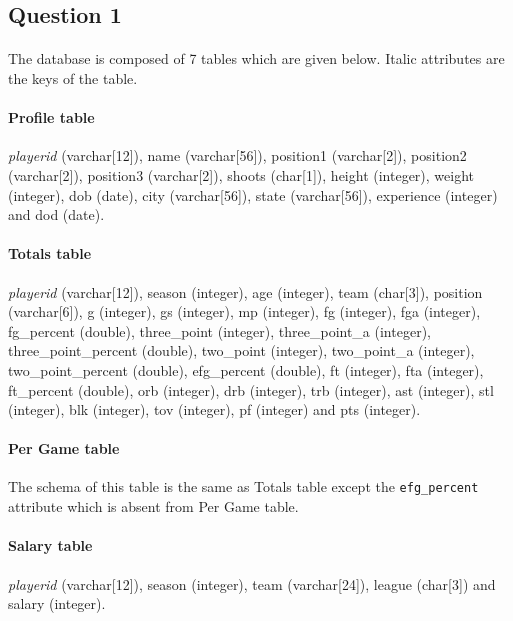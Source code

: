 
\subsection{Question 1}
\label{subsec:411}

\paragraph{}The database is composed of 7 tables which are given below. Italic attributes are the keys of the table.

\paragraph{Profile table}\textit{playerid} (varchar[12]), name (varchar[56]), position1 (varchar[2]), position2 (varchar[2]), position3 (varchar[2]), shoots (char[1]), height (integer), weight (integer), dob (date), city (varchar[56]), state (varchar[56]), experience (integer) and dod (date).

\paragraph{Totals table}\textit{playerid} (varchar[12]), season (integer), age (integer), team (char[3]), position (varchar[6]), g (integer), gs (integer), mp (integer), fg (integer), fga (integer), fg_percent (double), three_point (integer), three_point_a (integer), three_point_percent (double), two_point (integer), two_point_a (integer), two_point_percent (double), efg_percent (double), ft (integer), fta (integer), ft_percent (double), orb (integer), drb (integer), trb (integer), ast (integer), stl (integer), blk (integer), tov (integer), pf (integer) and pts (integer).

\paragraph{Per Game table}The schema of this table is the same as Totals table except the \texttt{efg_percent} attribute which is absent from Per Game table.

\paragraph{Salary table}\textit{playerid} (varchar[12]), season (integer), team (varchar[24]), league (char[3]) and salary (integer).


